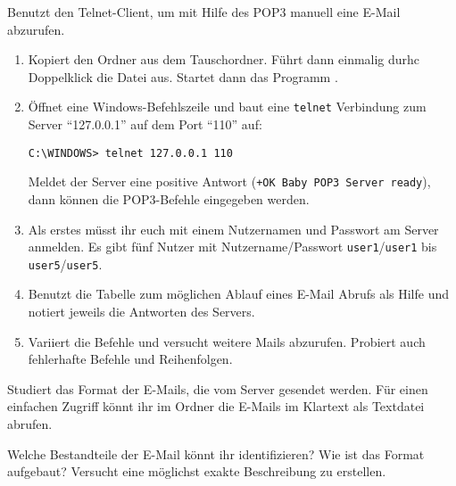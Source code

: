 \documentclass[10pt, a4paper]{scrartcl}
\begin{document}
\begin{aufgabe}
	Benutzt den Telnet-Client, um mit Hilfe des POP3 manuell eine E-Mail abzurufen.
	
	\begin{enumerate}
		\item Kopiert den Ordner  aus dem Tauschordner. Führt dann einmalig durhc Doppelklick die Datei  aus. Startet dann das Programm .
		\item Öffnet eine Windows-Befehlszeile und baut eine \texttt{telnet} Verbindung zum Server \enquote{127.0.0.1} auf dem Port \enquote{110} auf:

		\begin{center}
			\verb|C:\WINDOWS> telnet 127.0.0.1 110|
		\end{center}
		
		Meldet der Server eine positive Antwort (\verb|+OK Baby POP3 Server ready|), dann können die POP3-Befehle eingegeben werden.
		\item Als erstes müsst ihr euch mit einem Nutzernamen und Passwort am Server anmelden. Es gibt fünf Nutzer mit Nutzername/Passwort \texttt{user1}/\texttt{user1} bis \texttt{user5}/\texttt{user5}.
		\item Benutzt die Tabelle zum möglichen Ablauf eines E-Mail Abrufs als Hilfe und notiert jeweils die Antworten des Servers.
		\item Variiert die Befehle und versucht weitere Mails abzurufen. Probiert auch fehlerhafte Befehle und Reihenfolgen.
	\end{enumerate}
\end{aufgabe}

\begin{aufgabe}
	Studiert das Format der E-Mails, die vom Server gesendet werden. Für einen einfachen Zugriff könnt ihr im Ordner  die E-Mails im Klartext als Textdatei abrufen.
	
	\medskip
	Welche Bestandteile der E-Mail könnt ihr identifizieren? Wie ist das Format aufgebaut? Versucht eine möglichst exakte Beschreibung zu erstellen.
\end{aufgabe}
\end{document}
